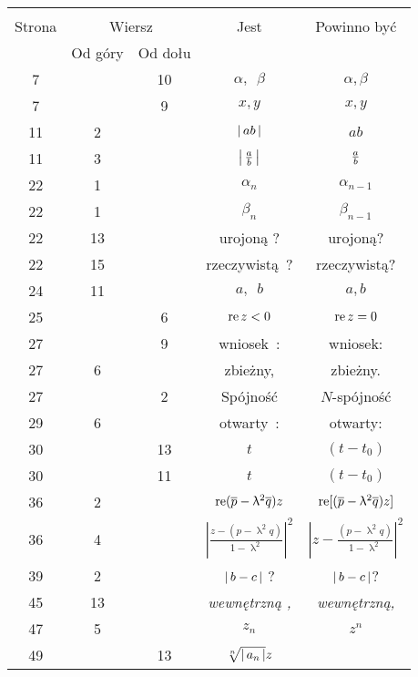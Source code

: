 \documentclass[a4paper,11pt]{article}
\begin{document}
\begin{center}
  \begin{tabular}{|c|c|c|c|c|}
    \hline
    & \multicolumn{2}{c|}{} & & \\
    Strona & \multicolumn{2}{c|}{Wiersz} & Jest
                              & Powinno być \\ \cline{2-3}
    & Od góry & Od dołu & & \\
    \hline
    7   & & 10 & $\alpha,\:\; \beta$ & $\alpha, \beta$ \\
    7   & &  9 & $x,\! y$ & $x, y$ \\
    11  &  2 & & $\left| \,  a b  \, \right|$ & $ab$ \\
    11  &  3 & & $\left| \,  \tfrac{ a }{ b }  \, \right|$ & $\tfrac{ a }{ b }$ \\
    22  &  1 & & $\alpha_{ n }$ & $\alpha_{ n - 1 }$ \\
    22  &  1 & & $\beta_{ n }$ & $\beta_{ n - 1 }$ \\
    22  & 13 & & urojoną ? & urojoną? \\
    22  & 15 & & rzeczywistą~? & rzeczywistą? \\
    24  & 11 & & $a, \:\; b$ & $a, b$ \\
    25  & &  6 & $\textrm{re}\, z < 0$ & $\textrm{re}\, z = 0$ \\
    27  & &  9 & wniosek~: & wniosek: \\
    27  &  6 & & zbieżny, & zbieżny. \\
    27  & &  2 & Spójność & $N$-spójność \\
    29  &  6 & & otwarty~: & otwarty: \\
    30  & & 13 & $t$ & $( t - t_{ 0 } )$ \\
    30  & & 11 & $t$ & $( t - t_{ 0 } )$ \\
    36  &  2 & & $\textrm{re}( \overline{ p } - \uplambda^{ 2 } \overline{ q } ) z$
           & $\textrm{re}[( \overline{ p } - \uplambda^{ 2 } \overline{ q } ) z]$ \\
    36  &  4 & & $\left| \frac{ z - ( p - \uplambda^{ 2 } q) }{ 1
                 - \uplambda^{ 2 } } \right|^{ 2 }$
           & $\left| z - \frac{ ( p - \uplambda^{ 2 } q) }{ 1
             - \uplambda^{ 2 } } \right|^{ 2 }$ \\
    39  &  2 & & $\left| \,  b - c  \, \right|$ ? & $\left| \,  b - c  \, \right|$? \\
    45  & 13 & & \emph{wewnętrzną ,} & \emph{wewnętrzną,} \\
    47  &  5 & & $z_{ n }$ & $z^{ n }$ \\
    49  & & 13 & $\sqrt[n]{ \left| \,  a_{ n }  \, \right| } z$

\end{tabular}
\end{center}
\end{document}
